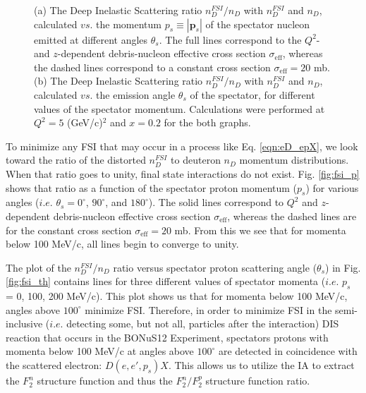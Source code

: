 \begin{figure}
\begin{subfigure}[b]{0.4\linewidth}
	\end{subfigure}
	\caption{(a) The Deep Inelastic Scattering ratio $n_{D}^{FSI}/n_D$ with $n_{D}^{FSI}$ and $n_D$, calculated $vs.$ the momentum $p_s \equiv |\mathbf{p}_s|$ of the spectator nucleon emitted at different angles $\theta_s$. The full lines correspond to the $Q^2$- and $z$-dependent debris-nucleon effective cross section $\sigma_{\mathrm{eff}}$, whereas the dashed lines correspond to a constant cross section $\sigma_{\mathrm{eff}} = 20$ mb. (b) The Deep Inelastic Scattering ratio $n_{D}^{FSI}/n_D$ with $n_{D}^{FSI}$ and $n_D$, calculated $vs.$ the emission angle $\theta_s$ of the spectator, for different values of the spectator momentum. Calculations were performed at $Q^2 = 5$ (GeV/c)$^2$ and $x = 0.2$ for the both graphs.}
	\label{fig:fsi}
\end{figure}

To minimize any FSI that may occur in a process like Eq. \ref{eqn:eD_epX}, we look toward the ratio of the distorted $n_{D}^{FSI}$ to deuteron $n_{D}$ momentum distributions. When that ratio goes to unity, final state interactions do not exist. Fig. \ref{fig:fsi_p} shows that ratio as a function of the spectator proton momentum ($p_s$) for various angles ($i.e.$ $\theta_s = 0^{\circ}$, $90^{\circ}$, and $180^{\circ}$). The solid lines correspond to $Q^2$ and $z$-dependent debris-nucleon effective cross section $\sigma_{\mathrm{eff}}$, whereas the dashed lines are for the constant cross section $\sigma_{\mathrm{eff}} = 20$ mb. From this we see that for momenta below 100 MeV/c, all lines begin to converge to unity.

The plot of the $n_{D}^{FSI}/n_{D}$ ratio versus spectator proton scattering angle ($\theta_s$) in Fig. \ref{fig:fsi_th} contains lines for three different values of spectator momenta ($i.e.$ $p_s$ = 0, 100, 200 MeV/c). This plot shows us that for momenta below 100 MeV/c, angles above $100^{\circ}$ minimize FSI. Therefore, in order to minimize FSI in the semi-inclusive ($i.e.$ detecting some, but not all, particles after the interaction) DIS reaction that occurs in the BONuS12 Experiment, spectators protons with momenta below 100 MeV/c at angles above $100^{\circ}$ are detected in coincidence with the scattered electron: $D(e,e',p_s)X$. This allows us to utilize the IA to extract the $F_2^n$ structure function and thus the $F_2^n/F_2^p$ structure function ratio.
